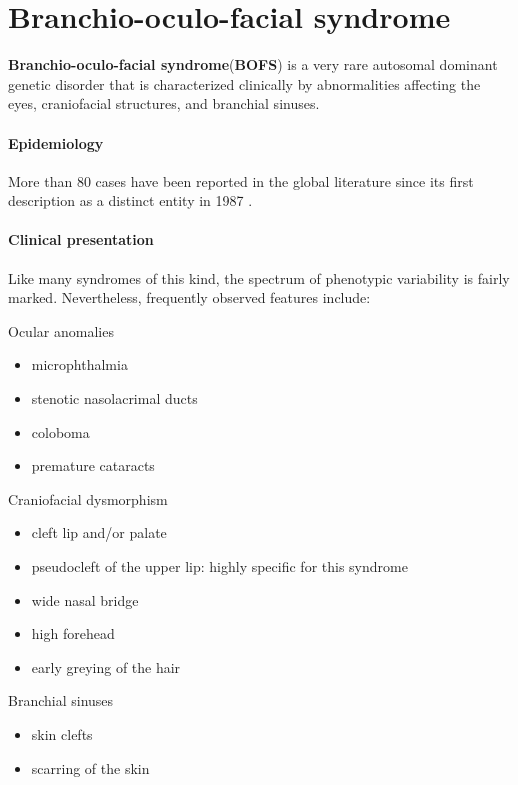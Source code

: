 \section{Branchio-oculo-facial syndrome}

\textbf{Branchio-oculo-facial syndrome}(\textbf{BOFS}) is a very rare autosomal dominant genetic disorder that is characterized clinically by abnormalities affecting the eyes, craniofacial structures, and branchial sinuses.

\paragraph{Epidemiology}

More than 80 cases have been reported in the global literature since its first description as a distinct entity in 1987 .

\paragraph{Clinical presentation}

Like many syndromes of this kind, the spectrum of phenotypic variability is fairly marked. Nevertheless, frequently observed features include:

Ocular anomalies

\begin{itemize}
	\tightlist
	\item
	microphthalmia
	\item
	stenotic nasolacrimal ducts
	\item
	coloboma
	\item
	premature cataracts
\end{itemize}

Craniofacial dysmorphism

\begin{itemize}
	\tightlist
	\item
	cleft lip and/or palate
	\item
	pseudocleft of the upper lip: highly specific for this syndrome
	\item
	wide nasal bridge
	\item
	high forehead
	\item
	early greying of the hair
\end{itemize}

Branchial sinuses

\begin{itemize}
	\tightlist
	\item
	skin clefts
	\item
	scarring of the skin
\end{itemize}

